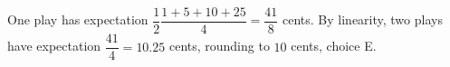 One play has expectation $\dfrac{1}{2}\dfrac{1+5+10+25}{4}=\dfrac{41}{8}$ cents. By linearity, two plays have expectation $\dfrac{41}{4}=10.25 $ cents, rounding to $\boxed{10}$ cents, choice E.
